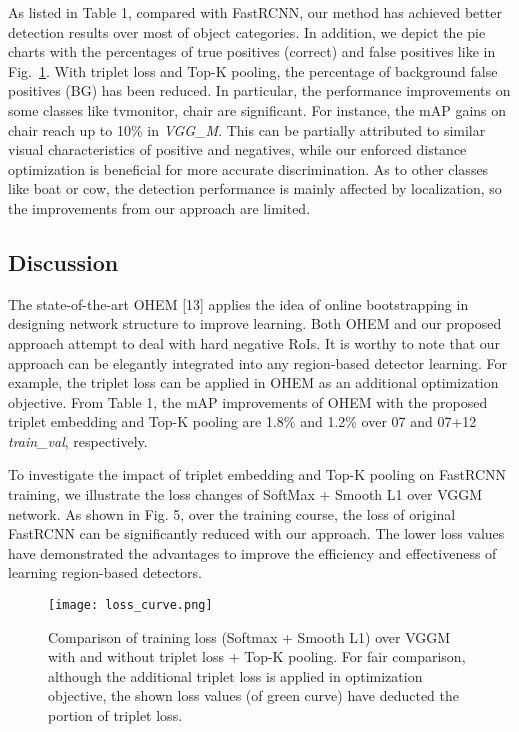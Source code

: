 \documentclass{article}
\begin{document}
{\begin{figure}
  \label{fraction_analysis}
  \vspace{-10pt}
\end{figure}

As listed in Table 1, compared with FastRCNN, our method has achieved better detection results over most of object categories. In addition, we depict the pie charts with the percentages of true positives (correct) and false positives like \cite{hoiem2012diagnosing} in Fig.~\ref{fraction_analysis}. With triplet loss and Top-K pooling, the percentage of background false positives (BG) has been reduced. In particular, the performance improvements on some classes like tvmonitor, chair are significant. For instance, the mAP gains on chair reach up to 10\% in \textit{VGG\_M}. This can be partially attributed to similar visual characteristics of positive and negatives, while our enforced distance optimization is beneficial for more accurate discrimination. As to other classes like boat or cow, the detection performance is mainly affected by localization, so the improvements from our approach are limited.

\subsection{Discussion}
The state-of-the-art OHEM [13] applies the idea of online bootstrapping in designing network structure to improve learning. Both OHEM and our proposed approach attempt to deal with hard negative RoIs. It is worthy to note that our approach can be elegantly integrated into any region-based detector learning. For example, the triplet loss can be applied in OHEM as an additional optimization objective. From Table 1, the mAP improvements of OHEM with the proposed triplet embedding and Top-K pooling are 1.8\% and 1.2\% over 07 and 07+12 \textit{train\_val}, respectively.

To investigate the impact of triplet embedding and Top-K pooling on FastRCNN training, we illustrate the loss changes of SoftMax + Smooth L1 over VGGM network. As shown in Fig. 5, over the training course, the loss of original FastRCNN can be significantly reduced with our approach. The lower loss values have demonstrated the advantages to improve the efficiency and effectiveness of learning region-based detectors.

\begin{figure}
\centering
 \vspace{-5pt}
\texttt{[image: loss\_curve.png]}
 \vspace{-15pt}
\caption{Comparison of training loss (Softmax + Smooth L1) over VGGM with and without triplet loss + Top-K pooling. For fair comparison, although the additional triplet loss is applied in optimization objective, the shown loss values (of green curve) have deducted the portion of triplet loss.}
\label{fig:loss_curve}
 \vspace{-15pt}
\end{figure}
}
\end{document}
